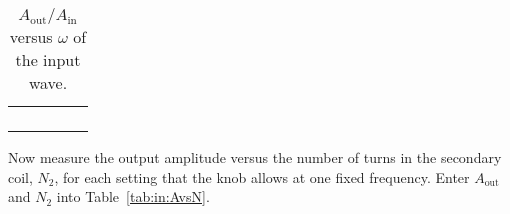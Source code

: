 \begin{table}[htb]
\begin{center}
\begin{tabular}{|c|c|c|c|c|}
\hline
\hspace*{2.5cm} & \hspace*{2.5cm} & \hspace*{2.5cm} & \hspace*{2.5cm} &
\hspace*{2.5cm} \\
\hspace*{2.5cm} & \hspace*{2.5cm} & \hspace*{2.5cm} & \hspace*{2.5cm} &
\hspace*{2.5cm} \\


\hline
\hspace*{2.5cm} & \hspace*{2.5cm} & \hspace*{2.5cm} & \hspace*{2.5cm} &
\hspace*{2.5cm} \\
\hspace*{2.5cm} & \hspace*{2.5cm} & \hspace*{2.5cm} & \hspace*{2.5cm} &
\hspace*{2.5cm} \\


\hline
\end{tabular}
\end{center}
\caption{$A_{\mbox{out}}/A_{\mbox{in}}$ versus $\omega$ of the
input wave.}
\label{tab:in:Avsw}
\end{table}

\noindent Now measure the output amplitude versus the number of turns in the
secondary coil, $N_2$, for each setting that the knob allows at one fixed
frequency. Enter $A_{\mbox{out}}$ and $N_2$ into Table~\ref{tab:in:AvsN}.

